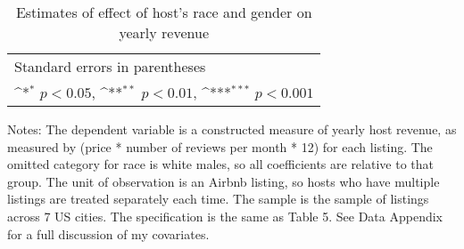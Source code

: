 \documentclass[11pt, oneside]{article}
\begin{document}
\begin{table}[htbp]\centering
	\def\sym#1{\ifmmode^{#1}\else\(^{#1}\)\fi}
	\caption{Estimates of effect of host's race and gender on yearly revenue}
	\begin{tabular}{l*{4}{c}}
		\hline\hline
		
		\hline\hline
		\multicolumn{5}{l}{\footnotesize Standard errors in parentheses}\\
		\multicolumn{5}{l}{\footnotesize \sym{*} \(p<0.05\), \sym{**} \(p<0.01\), \sym{***} \(p<0.001\)}\\
	\end{tabular}

	\begin{tablenotes}

		\item Notes: The dependent variable is a constructed measure of yearly host revenue, as measured by (price * number of reviews per month * 12) for each listing. The omitted category for race is white males, so all coefficients are relative to that group. The unit of observation is an Airbnb listing, so hosts who have multiple listings are treated separately each time. The sample is the sample of listings across 7 US cities. The specification is the same as Table 5. See Data Appendix for a full discussion of my covariates.
	\end{tablenotes}
\end{table}
\end{document}
